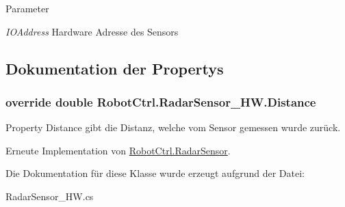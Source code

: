 \begin{DoxyParams}{Parameter}
\item[{\em IOAddress}]Hardware Adresse des Sensors \end{DoxyParams}


\subsection{Dokumentation der Propertys}
\hypertarget{class_robot_ctrl_1_1_radar_sensor___h_w_a0eb1060a6e45bb29fdbf99e35481311e}{
\subsubsection[{Distance}]{\setlength{\rightskip}{0pt plus 5cm}override double RobotCtrl.RadarSensor\_\-HW.Distance}}
\label{class_robot_ctrl_1_1_radar_sensor___h_w_a0eb1060a6e45bb29fdbf99e35481311e}
Property Distance gibt die Distanz, welche vom Sensor gemessen wurde zur\"{u}ck. 

Erneute Implementation von \hyperlink{class_robot_ctrl_1_1_radar_sensor_a1be5541f3153ba40736f7a9fa292375b}{RobotCtrl.RadarSensor}.



Die Dokumentation für diese Klasse wurde erzeugt aufgrund der Datei:\begin{DoxyCompactItemize}
\item 
RadarSensor\_\-HW.cs\end{DoxyCompactItemize}
